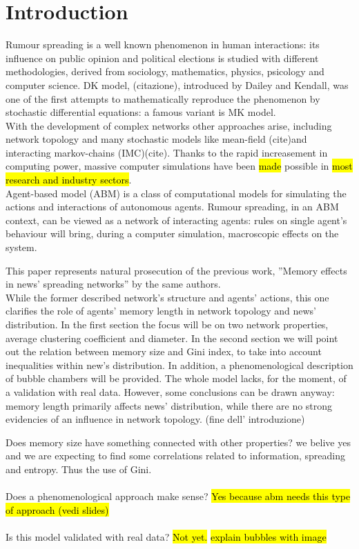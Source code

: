 \section{Introduction}
Rumour spreading is a well known phenomenon in human interactions:
its influence on public opinion and political elections is studied
with different methodologies, derived from sociology, mathematics,
physics, psicology and computer science.
DK model, (citazione), introduced by Dailey and Kendall, was one of
the first attempts to mathematically reproduce the phenomenon by
stochastic differential equations: a famous variant is MK model.\\
With the development of complex networks other approaches arise,
including network topology and many stochastic models
like mean-field (cite)and interacting markov-chains (IMC)(cite).
Thanks to the rapid increasement in computing power,
massive computer simulations have been \hl{made} possible in
\hl{most research and industry sectors}.\\
Agent-based model (ABM) is a class of computational models for
simulating the actions and interactions of autonomous agents.
Rumour spreading, in an ABM context, can be viewed as a network
of interacting agents: rules on single agent's behaviour
will bring, during a computer simulation, macroscopic
effects on the system.

This paper represents natural prosecution of the previous work,
''Memory effects in news' spreading networks'' by the same authors.\\
While the former described network's structure and agents' actions, this one clarifies the role of agents' memory length in network topology and news' distribution.
In the first section the focus will be on two network properties, average clustering coefficient and diameter.
In the second section we will point out the relation between memory size
and Gini index, to take into account inequalities within new's distribution.
In addition, a phenomenological description of bubble chambers will be provided.
The whole model lacks, for the moment, of a validation with real data.
However, some conclusions can be drawn anyway: memory length primarily affects news' distribution, while there are no strong evidencies of an influence in network topology.
(fine dell' introduzione)


Does memory size have something connected with other properties?
we belive yes and we are expecting to find some correlations related
to information, spreading and entropy. Thus the use of Gini.\\ \\
Does a phenomenological approach make sense? \hl{Yes because abm needs
this type of approach (vedi slides)}\\ \\
Is this model validated with real data? \hl{Not yet.}
\hl{explain bubbles with image}